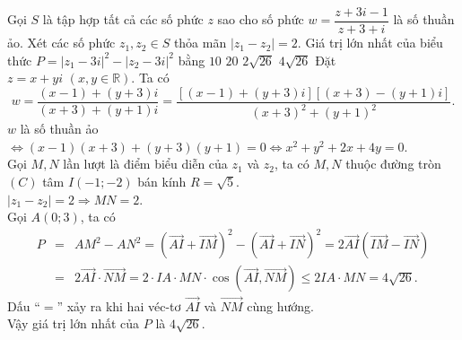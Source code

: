 \begin{ex}%
Gọi $S$ là tập hợp tất cả các số phức $z$ sao cho số phức $w=\dfrac{z+3i-1}{z+3+i}$ là số thuần ảo. Xét các số phức $z_1,z_2\in S$ thỏa mãn $\left |z_1-z_2 \right |=2$. Giá trị lớn nhất của biểu thức $P=\left |z_1-3i \right |^2-\left |z_2-3i \right |^2$ bằng
\choice 
{$10$} 
{$20$}
{$2\sqrt{26}$} 
{\True $4\sqrt{26}$}
\loigiai
{
Đặt $z=x+yi\,\,(x,y\in\mathbb{R})$. Ta có
$$w=\dfrac{(x-1)+(y+3)i}{(x+3)+(y+1)i}=\dfrac{\left [(x-1)+(y+3)i \right ]\left [(x+3)-(y+1)i \right ]}{(x+3)^2+(y+1)^2}.$$
$w$ là số thuần ảo $\Leftrightarrow (x-1)(x+3)+(y+3)(y+1)=0\Leftrightarrow x^2+y^2+2x+4y=0$.\\
Gọi $M,N$ lần lượt là điểm biểu diễn của $z_1$ và $z_2$, ta có $M,N$ thuộc đường tròn $(C)$ tâm $I(-1;-2)$ bán kính $R=\sqrt{5}$.\\
$\left |z_1-z_2 \right |=2\Rightarrow MN=2$.\\
Gọi $A(0;3)$, ta có
\begin{eqnarray*}
P&=&AM^2-AN^2=\left (\overrightarrow{AI}+\overrightarrow{IM} \right )^2-\left (\overrightarrow{AI}+\overrightarrow{IN} \right )^2=2\overrightarrow{AI}\left (\overrightarrow{IM}-\overrightarrow{IN} \right )\\&=&2\overrightarrow{AI}\cdot\overrightarrow{NM}=2\cdot IA\cdot MN\cdot\cos\left (\overrightarrow{AI},\overrightarrow{NM} \right )\le 2IA\cdot MN=4\sqrt{26}.
\end{eqnarray*}
Dấu ``$=$'' xảy ra khi hai véc-tơ $\overrightarrow{AI}$ và $\overrightarrow{NM}$ cùng hướng.\\
Vậy giá trị lớn nhất của $P$ là $4\sqrt{26}$.
}
\end{ex}

